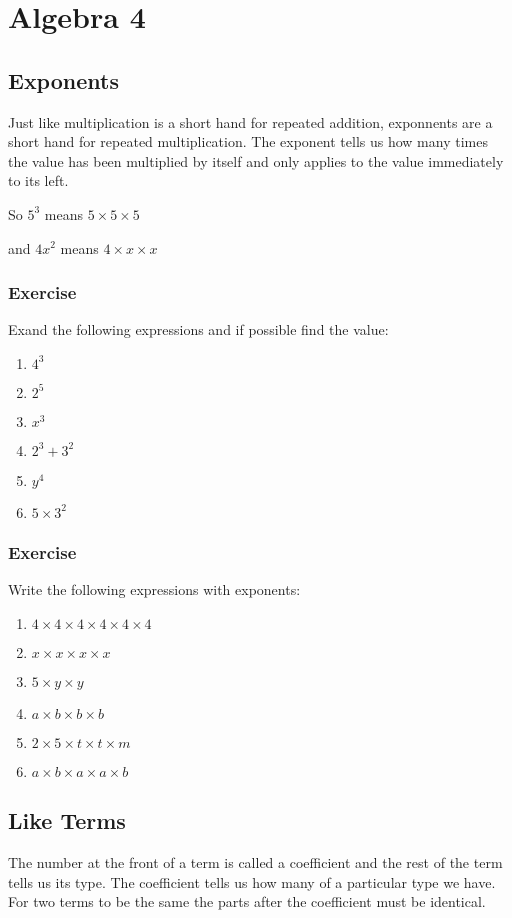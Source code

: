 \chapter{Algebra 4}
\section{Exponents}
Just like multiplication is a short hand for repeated addition, exponnents are a short hand for repeated multiplication.  The exponent tells us how many times the value has been multiplied by itself and only applies to the value immediately to its left.

\bigskip

So $5^3$ means $5 \times 5 \times 5$ 

\bigskip

and $4x^2$ means $4 \times x \times x$

\subsection{Exercise}
Exand the following expressions and if possible find the value:
\begin{enumerate}
	\item $4^3$
	\item $2^5$
	\item $x^3$
	\item $2^3 + 3^2$
	\item $y^4$
	\item $5 \times 3^2$
\end{enumerate}

\subsection{Exercise}
Write the following expressions with exponents:
\begin{enumerate}
	\item $4 \times 4 \times 4 \times 4 \times 4 \times 4$
	\item $x \times x \times x \times x$
	\item $5 \times y \times y$
	\item $a \times b \times b \times b$
	\item $2 \times 5 \times t \times t \times m$
	\item $a \times b \times a \times a \times b$
\end{enumerate}

\section{Like Terms}
The number at the front of a term is called a coefficient and the rest of the term tells us its type.  The coefficient tells us how many of a particular type we have.  For two terms to be the same the parts after the coefficient must be identical.

